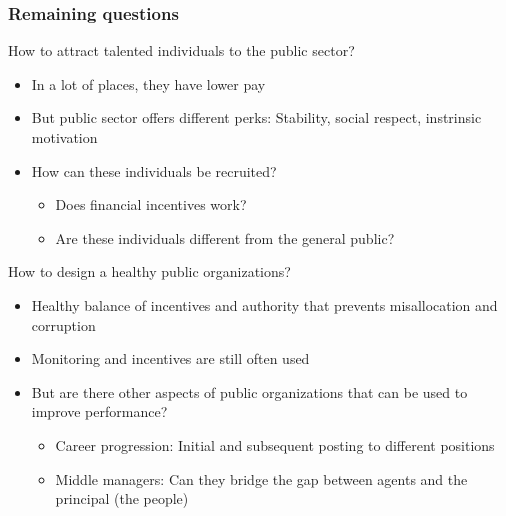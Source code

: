 \documentclass[aspectratio=169]{beamer}
\begin{document}
\begin{frame}
\frametitle{Remaining questions} 
How to attract talented individuals to the public sector?
\begin{itemize}\setlength\itemsep{3pt}
\item In a lot of places, they have lower pay
\item But public sector offers different perks: Stability, social respect, instrinsic motivation
\item How can these individuals be recruited?
\begin{itemize}\setlength\itemsep{3pt}
\item Does financial incentives work?
\item Are these individuals different from the general public?
\end{itemize}
\end{itemize}\medskip
How to design a healthy public organizations?
\begin{itemize}\setlength\itemsep{3pt}
\item Healthy balance of incentives and authority that prevents misallocation and corruption
\item Monitoring and incentives are still often used
\item But are there other aspects of public organizations that can be used to improve performance?
\begin{itemize}\setlength\itemsep{3pt}
\item Career progression: Initial and subsequent posting to different positions
\item Middle managers: Can they bridge the gap between agents and the principal (the people)
\end{itemize}
\end{itemize}
\end{frame}



\end{document}
